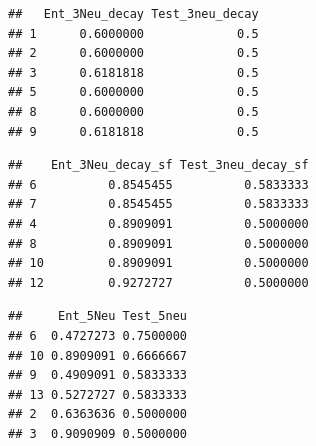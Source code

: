 \documentclass[]{article}
\newenvironment{Shaded}{\begin{snugshade}}{\end{snugshade}}
\newcommand{\KeywordTok}[1]{\textcolor[rgb]{0.13,0.29,0.53}{\textbf{#1}}}
\newcommand{\DataTypeTok}[1]{\textcolor[rgb]{0.13,0.29,0.53}{#1}}
\newcommand{\DecValTok}[1]{\textcolor[rgb]{0.00,0.00,0.81}{#1}}
\newcommand{\OperatorTok}[1]{\textcolor[rgb]{0.81,0.36,0.00}{\textbf{#1}}}
\newcommand{\NormalTok}[1]{#1}
\begin{document}
\begin{verbatim}
##   Ent_3Neu_decay Test_3neu_decay
## 1      0.6000000             0.5
## 2      0.6000000             0.5
## 3      0.6181818             0.5
## 5      0.6000000             0.5
## 8      0.6000000             0.5
## 9      0.6181818             0.5
\end{verbatim}

\begin{Shaded}
\end{Shaded}

\begin{verbatim}
##    Ent_3Neu_decay_sf Test_3neu_decay_sf
## 6          0.8545455          0.5833333
## 7          0.8545455          0.5833333
## 4          0.8909091          0.5000000
## 8          0.8909091          0.5000000
## 10         0.8909091          0.5000000
## 12         0.9272727          0.5000000
\end{verbatim}

\begin{Shaded}
\end{Shaded}

\begin{verbatim}
##     Ent_5Neu Test_5neu
## 6  0.4727273 0.7500000
## 10 0.8909091 0.6666667
## 9  0.4909091 0.5833333
## 13 0.5272727 0.5833333
## 2  0.6363636 0.5000000
## 3  0.9090909 0.5000000
\end{verbatim}

\begin{Shaded}
\end{Shaded}
\end{document}
